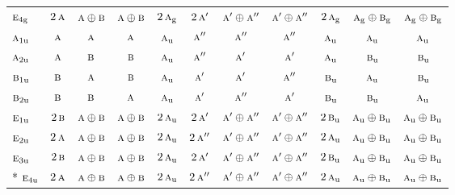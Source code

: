 \documentclass[10pt,a4paper]{article}
\numberwithin{equation}{section}
\newcommand{\irr}[1]{\text{\normalfont\scshape #1}}
\newcommand{\ptag}[1]{\mathrm{#1}}
\begin{document}
{\begin{longtable}{@{}lcccccccccc@{}}
$\irr{e}_{4\ptag{g}}$ & $2\,\irr{a}$ & $\irr{a}\oplus \irr{b}$ & $\irr{a}\oplus \irr{b}$ & $2\,\irr{a}_{\ptag{g}}$ & $2\,\irr{a}'$ & $\irr{a}'\oplus \irr{a}''$ & $\irr{a}'\oplus \irr{a}''$ & $2\,\irr{a}_{\ptag{g}}$ & $\irr{a}_{\ptag{g}}\oplus \irr{b}_{\ptag{g}}$ & $\irr{a}_{\ptag{g}}\oplus \irr{b}_{\ptag{g}}$\\
$\irr{a}_{1\ptag{u}}$ & $\irr{a}$ & $\irr{a}$ & $\irr{a}$ & $\irr{a}_{\ptag{u}}$ & $\irr{a}''$ & $\irr{a}''$ & $\irr{a}''$ & $\irr{a}_{\ptag{u}}$ & $\irr{a}_{\ptag{u}}$ & $\irr{a}_{\ptag{u}}$\\
$\irr{a}_{2\ptag{u}}$ & $\irr{a}$ & $\irr{b}$ & $\irr{b}$ & $\irr{a}_{\ptag{u}}$ & $\irr{a}''$ & $\irr{a}'$ & $\irr{a}'$ & $\irr{a}_{\ptag{u}}$ & $\irr{b}_{\ptag{u}}$ & $\irr{b}_{\ptag{u}}$\\
$\irr{b}_{1\ptag{u}}$ & $\irr{b}$ & $\irr{a}$ & $\irr{b}$ & $\irr{a}_{\ptag{u}}$ & $\irr{a}'$ & $\irr{a}'$ & $\irr{a}''$ & $\irr{b}_{\ptag{u}}$ & $\irr{a}_{\ptag{u}}$ & $\irr{b}_{\ptag{u}}$\\
$\irr{b}_{2\ptag{u}}$ & $\irr{b}$ & $\irr{b}$ & $\irr{a}$ & $\irr{a}_{\ptag{u}}$ & $\irr{a}'$ & $\irr{a}''$ & $\irr{a}'$ & $\irr{b}_{\ptag{u}}$ & $\irr{b}_{\ptag{u}}$ & $\irr{a}_{\ptag{u}}$\\
$\irr{e}_{1\ptag{u}}$ & $2\,\irr{b}$ & $\irr{a}\oplus \irr{b}$ & $\irr{a}\oplus \irr{b}$ & $2\,\irr{a}_{\ptag{u}}$ & $2\,\irr{a}'$ & $\irr{a}'\oplus \irr{a}''$ & $\irr{a}'\oplus \irr{a}''$ & $2\,\irr{b}_{\ptag{u}}$ & $\irr{a}_{\ptag{u}}\oplus \irr{b}_{\ptag{u}}$ & $\irr{a}_{\ptag{u}}\oplus \irr{b}_{\ptag{u}}$\\
$\irr{e}_{2\ptag{u}}$ & $2\,\irr{a}$ & $\irr{a}\oplus \irr{b}$ & $\irr{a}\oplus \irr{b}$ & $2\,\irr{a}_{\ptag{u}}$ & $2\,\irr{a}''$ & $\irr{a}'\oplus \irr{a}''$ & $\irr{a}'\oplus \irr{a}''$ & $2\,\irr{a}_{\ptag{u}}$ & $\irr{a}_{\ptag{u}}\oplus \irr{b}_{\ptag{u}}$ & $\irr{a}_{\ptag{u}}\oplus \irr{b}_{\ptag{u}}$\\
$\irr{e}_{3\ptag{u}}$ & $2\,\irr{b}$ & $\irr{a}\oplus \irr{b}$ & $\irr{a}\oplus \irr{b}$ & $2\,\irr{a}_{\ptag{u}}$ & $2\,\irr{a}'$ & $\irr{a}'\oplus \irr{a}''$ & $\irr{a}'\oplus \irr{a}''$ & $2\,\irr{b}_{\ptag{u}}$ & $\irr{a}_{\ptag{u}}\oplus \irr{b}_{\ptag{u}}$ & $\irr{a}_{\ptag{u}}\oplus \irr{b}_{\ptag{u}}$\\*
$\irr{e}_{4\ptag{u}}$ & $2\,\irr{a}$ & $\irr{a}\oplus \irr{b}$ & $\irr{a}\oplus \irr{b}$ & $2\,\irr{a}_{\ptag{u}}$ & $2\,\irr{a}''$ & $\irr{a}'\oplus \irr{a}''$ & $\irr{a}'\oplus \irr{a}''$ & $2\,\irr{a}_{\ptag{u}}$ & $\irr{a}_{\ptag{u}}\oplus \irr{b}_{\ptag{u}}$ & $\irr{a}_{\ptag{u}}\oplus \irr{b}_{\ptag{u}}$\\
\bottomrule\end{longtable}}
\end{document}
